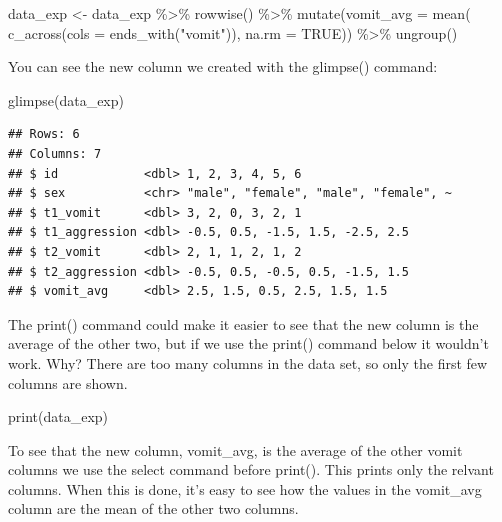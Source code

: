 \documentclass[
]{krantz}
\makeatletter
\newenvironment{Shaded}{\begin{snugshade}}{\end{snugshade}}
\newcommand{\AttributeTok}[1]{\textcolor[rgb]{0.61,0.61,0.61}{#1}}
\newcommand{\ConstantTok}[1]{\textcolor[rgb]{0,0,0}{#1}}
\newcommand{\FunctionTok}[1]{\textcolor[rgb]{0,0,0}{#1}}
\newcommand{\NormalTok}[1]{#1}
\newcommand{\OtherTok}[1]{\textcolor[rgb]{0.37,0.37,0.37}{#1}}
\newcommand{\SpecialCharTok}[1]{\textcolor[rgb]{0,0,0}{#1}}
\newcommand{\StringTok}[1]{\textcolor[rgb]{0.5,0.5,0.5}{#1}}
\newenvironment{kframe}{%
\medskip{}
\setlength{\fboxsep}{.8em}
 \def\at@end@of@kframe{}%
 \ifinner\ifhmode%
  \def\at@end@of@kframe{\end{minipage}}%
  \begin{minipage}{\columnwidth}%
 \fi\fi%
 \def\FrameCommand##1{\hskip\@totalleftmargin \hskip-\fboxsep
 \colorbox{shadecolor}{##1}\hskip-\fboxsep
     \hskip-\linewidth \hskip-\@totalleftmargin \hskip\columnwidth}%
 \MakeFramed {\advance\hsize-\width
   \@totalleftmargin\z@ \linewidth\hsize
   \@setminipage}}%
 {\par\unskip\endMakeFramed%
 \at@end@of@kframe}
\renewenvironment{Shaded}{\begin{kframe}}{\end{kframe}}
\makeatother
\begin{document}
\begin{Shaded}
\begin{Highlighting}[]
\NormalTok{data\_exp }\OtherTok{\textless{}{-}}\NormalTok{ data\_exp }\SpecialCharTok{\%\textgreater{}\%} 
  \FunctionTok{rowwise}\NormalTok{() }\SpecialCharTok{\%\textgreater{}\%} 
  \FunctionTok{mutate}\NormalTok{(}\AttributeTok{vomit\_avg =} \FunctionTok{mean}\NormalTok{( }\FunctionTok{c\_across}\NormalTok{(}\AttributeTok{cols =} \FunctionTok{ends\_with}\NormalTok{(}\StringTok{"vomit"}\NormalTok{)),}
                           \AttributeTok{na.rm =} \ConstantTok{TRUE}\NormalTok{)) }\SpecialCharTok{\%\textgreater{}\%}
  \FunctionTok{ungroup}\NormalTok{()}
\end{Highlighting}
\end{Shaded}

You can see the new column we created with the glimpse() command:

\begin{Shaded}
\begin{Highlighting}[]
\FunctionTok{glimpse}\NormalTok{(data\_exp)}
\end{Highlighting}
\end{Shaded}

\begin{verbatim}
## Rows: 6
## Columns: 7
## $ id            <dbl> 1, 2, 3, 4, 5, 6
## $ sex           <chr> "male", "female", "male", "female", ~
## $ t1_vomit      <dbl> 3, 2, 0, 3, 2, 1
## $ t1_aggression <dbl> -0.5, 0.5, -1.5, 1.5, -2.5, 2.5
## $ t2_vomit      <dbl> 2, 1, 1, 2, 1, 2
## $ t2_aggression <dbl> -0.5, 0.5, -0.5, 0.5, -1.5, 1.5
## $ vomit_avg     <dbl> 2.5, 1.5, 0.5, 2.5, 1.5, 1.5
\end{verbatim}

The print() command could make it easier to see that the new column is the average of the other two, but if we use the print() command below it wouldn't work. Why? There are too many columns in the data set, so only the first few columns are shown.

\begin{Shaded}
\begin{Highlighting}[]
\FunctionTok{print}\NormalTok{(data\_exp)}
\end{Highlighting}
\end{Shaded}

To see that the new column, vomit\_avg, is the average of the other vomit columns we use the select command before print(). This prints only the relvant columns. When this is done, it's easy to see how the values in the vomit\_avg column are the mean of the other two columns.
\end{document}
